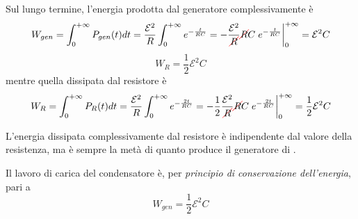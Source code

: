 Sul lungo termine, l'energia prodotta dal generatore complessivamente è
\begin{equation*}
	W_{gen}=\int_{0}^{+\infty}P_{gen}(t)dt=\frac{\mathcal{E}^2}{R}\int_{0}^{+\infty}e^{-\frac{t}{RC}}=-\frac{\mathcal{E}^2}{\Ccancel[red]{R}}\Ccancel[red]{R}C\eval{e^{-\frac{t}{RC}}}_{0}^{+\infty}=\mathcal{E}^2C
\end{equation*}
\begin{equation}
	W_{R}=\frac{1}{2}\mathcal{E}^2C
\end{equation}
mentre quella dissipata dal resistore è
\begin{equation*}
	W_{R}=\int_{0}^{+\infty}P_{R}(t)dt=\frac{\mathcal{E}^2}{R}\int_{0}^{+\infty}e^{-\frac{2t}{RC}}=-\frac{1}{2}\frac{\mathcal{E}^2}{\Ccancel[red]{R}}\Ccancel[red]{R}C\eval{e^{-\frac{2t}{RC}}}_{0}^{+\infty}=\frac{1}{2}\mathcal{E}^2C
\end{equation*}
\begin{observe}
	L'energia dissipata complessivamente dal resistore è indipendente dal valore della resistenza, ma è sempre la metà di quanto produce il generatore di \fem.
\end{observe}
Il lavoro di carica del condensatore è, per \textit{principio di conservazione dell'energia}, pari a 
\begin{equation}
	W_{gen}=\frac{1}{2}\mathcal{E}^2C
\end{equation}
